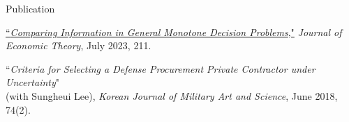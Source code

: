 
\begin{rSection}{Publication}
	
	\begin{etaremune}
		\item \href{https://yonggyun-yg-kim.github.io/files/Research%20papers/GMDP_JET.pdf}{``\textit{Comparing Information in General Monotone Decision Problems},"} 
		\textit{Journal of Economic Theory}, July 2023, 211. 
		
		\item 
		``\textit{Criteria for Selecting a Defense Procurement Private Contractor under Uncertainty}"\\
		(with Sungheui Lee), \textit{Korean Journal of Military Art and Science}, June 2018, 74(2). 
	\end{etaremune}
	
	
	
\end{rSection}